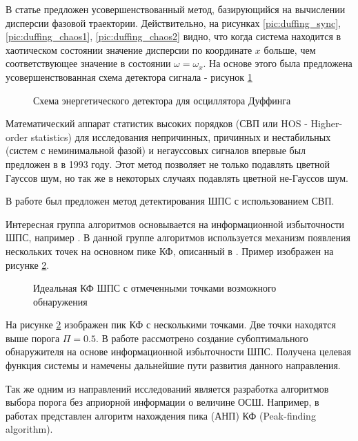 В статье \cite{chaos_chen} предложен усовершенствованный метод, базирующийся на вычислении дисперсии
фазовой траектории. Действительно, на рисунках \ref{pic:duffing_sync}, \ref{pic:duffing_chaos1},
\ref{pic:duffing_chaos2} видно, что когда система находится в хаотическом состоянии значение
дисперсии по координате ${x}$ больше, чем соответствующее значение в состоянии $\omega = \omega_{x}$.
На основе этого была предложена усовершенствованная схема детектора сигнала - рисунок \ref{pic:chaos_energy_detector}
\begin{figure}[H]
	\center{}
	\caption{Схема энергетического детектора для осциллятора Дуффинга}
	\label{pic:chaos_energy_detector}
\end{figure}

Математический аппарат статистик высоких порядков (СВП или HOS - Higher-order statistics)
для исследования непричинных, причинных и нестабильных (систем с неминимальной фазой) и негауссовых сигналов впервые был предложен
в \cite{hos_petropulu} в 1993 году.  Этот метод позволяет не только подавлять цветной Гауссов шум, но так же в некоторых случаях подавлять
цветной не-Гауссов шум.

В работе \cite{hos_zhao} был предложен метод детектирования ШПС с использованием СВП.

Интересная группа алгоритмов основывается на информационной избыточности ШПС, например \cite{phd_che}. В данной
группе алгоритмов используется механизм появления нескольких точек на основном пике КФ, описанный в \cite{kaplan}. Пример
изображен на рисунке \ref{pic:sec1_peak_tcd}.
\begin{figure}[H]
        \center{}
        \caption{Идеальная КФ ШПС с отмеченными точками возможного обнаружения}
        \label{pic:sec1_peak_tcd}
\end{figure}
На рисунке \ref{pic:sec1_peak_tcd} изображен пик КФ с несколькими точками. Две точки находятся выше порога ${\Pi=0.5}$.
В работе \cite{phd_che} рассмотрено создание субоптимального обнаружителя на основе информационной избыточности ШПС.
Получена целевая функция системы и намечены дальнейшие пути развития данного направления.

Так же одним из направлений исследований является разработка алгоритмов выбора порога без априорной информации о величине ОСШ. Например,
в работах \cite{2max_ieee, 2max_article} представлен алгоритм нахождения пика (АНП) КФ (Peak-finding algorithm).

